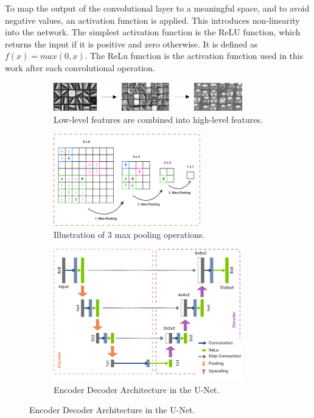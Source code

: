 To map the output of the convolutional layer to a meaningful space, and to avoid negative values, an activation function is applied. This introduces non-linearity into the network. The simplest activation function is the ReLU function, which returns the input if it is positive and zero otherwise. It is defined as $f(x) = max(0, x)$. The ReLu function is the activation function used in this work after each convolutional operation.

\begin{figure}[H]
    \begin{subfigure}{1\textwidth}
        \centering
        \includegraphics[width=0.9\textwidth]{resources/images/abstraction.png}
        \caption{Low-level features are combined into high-level features.}
        \label{fig: abstraction}
    \end{subfigure}
    \begin{subfigure}{\textwidth}
        \centering
        \vspace{0.5cm}
        \includegraphics[width=0.7\textwidth]{resources/images/max_pooling.png}
        \caption{Illustration of 3 max pooling operations.}
        \label{fig: max_pooling}
    \end{subfigure}
    \begin{subfigure}{\textwidth}
        \centering
        \vspace{0.5cm}
        \includegraphics[width=0.9\textwidth]{resources/images/u_net.png}
        \caption{Encoder Decoder Architecture in the U-Net.}
        \label{fig: u_net}
    \end{subfigure}
\end{figure}

